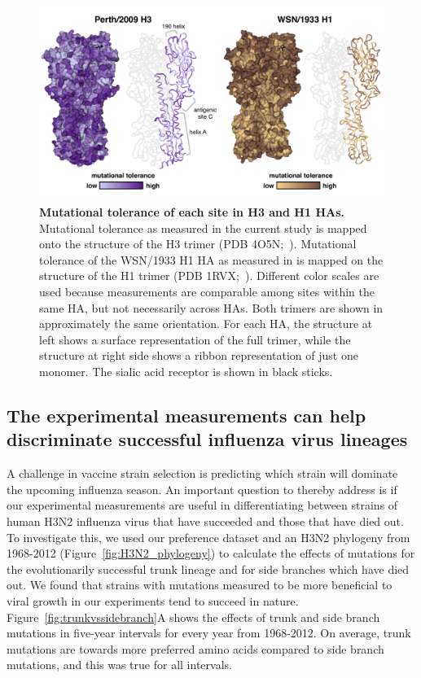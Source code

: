 \documentclass[9pt,twocolumn,twoside]{pnas-new}
\begin{document}
\begin{figure}
\centering
\includegraphics[width=11.4cm]{figs/mut_tolerance/entropy_heatmap.pdf}
\caption{\label{fig:mut_tolerance}
{\bf Mutational tolerance of each site in H3 and H1 HAs.}
Mutational tolerance as measured in the current study is mapped onto the structure of the H3 trimer (PDB 4O5N;~\cite{lee2014receptor}).
Mutational tolerance of the WSN/1933 H1 HA as measured in \cite{doud2016accurate} is mapped on the structure of the H1 trimer (PDB 1RVX;~\cite{gamblin2004structure}).
Different color scales are used because measurements are comparable among sites within the same HA, but not necessarily across HAs.
Both trimers are shown in approximately the same orientation. 
For each HA, the structure at left shows a surface representation of the full trimer, while the structure at right side shows a ribbon representation of just one monomer.
The sialic acid receptor is shown in black sticks.
}
\end{figure}

\subsection*{The experimental measurements can help discriminate successful influenza virus lineages}
A challenge in vaccine strain selection is predicting which strain will dominate the upcoming influenza season.
An important question to thereby address is if our experimental measurements are useful in differentiating between strains of human H3N2 influenza virus that have succeeded and those that have died out.
To investigate this, we used our preference dataset and an H3N2 phylogeny from 1968-2012 (Figure~\ref{fig:H3N2_phylogeny}) to calculate the effects of mutations for the evolutionarily successful trunk lineage and for side branches which have died out.
We found that strains with mutations measured to be more beneficial to viral growth in our experiments tend to succeed in nature.
Figure~\ref{fig:trunkvssidebranch}A shows the effects of trunk and side branch mutations in five-year intervals for every year from 1968-2012. 
On average, trunk mutations are towards more preferred amino acids compared to side branch mutations, and this was true for all intervals.
\end{document}
